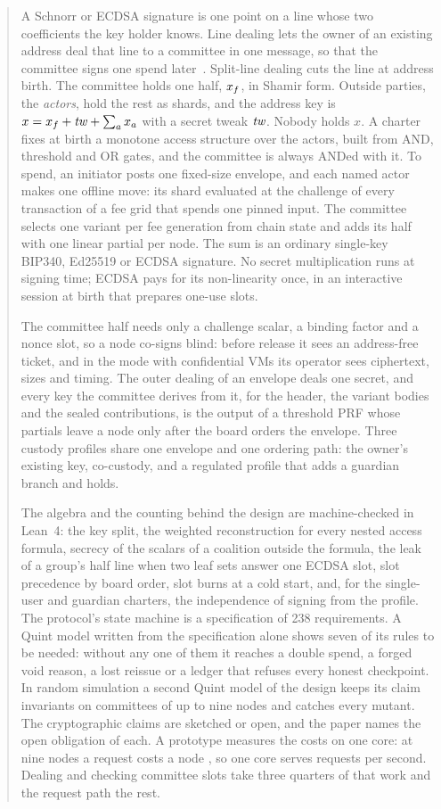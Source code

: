 \begin{abstract}
A Schnorr or ECDSA signature is one point on a line whose two coefficients the key holder knows. Line dealing lets the owner of an existing address deal that line to a committee in one message, so that the committee signs one spend later~\cite{LD}. Split-line dealing cuts the line at address birth. The committee holds one half, $\xf$, in Shamir form. Outside parties, the \emph{actors}, hold the rest as shards, and the address key is $x = \xf + \tw + \sum_a x_a$ with a secret tweak $\tw$. Nobody holds $x$. A charter fixes at birth a monotone access structure over the actors, built from AND, threshold and OR gates, and the committee is always ANDed with it. To spend, an initiator posts one fixed-size envelope, and each named actor makes one offline move: its shard evaluated at the challenge of every transaction of a fee grid that spends one pinned input. The committee selects one variant per fee generation from chain state and adds its half with one linear partial per node. The sum is an ordinary single-key BIP340, Ed25519 or ECDSA signature. No secret multiplication runs at signing time; ECDSA pays for its non-linearity once, in an interactive session at birth that prepares one-use slots.

The committee half needs only a challenge scalar, a binding factor and a nonce slot, so a node co-signs blind: before release it sees an address-free ticket, and in the mode with confidential VMs its operator sees ciphertext, sizes and timing. The outer dealing of an envelope deals one secret, and every key the committee derives from it, for the header, the variant bodies and the sealed contributions, is the output of a threshold PRF whose partials leave a node only after the board orders the envelope. Three custody profiles share one envelope and one ordering path: the owner's existing key, co-custody, and a regulated profile that adds a guardian branch and holds.

The algebra and the counting behind the design are machine-checked in Lean~4: the key split, the weighted reconstruction for every nested access formula, secrecy of the scalars of a coalition outside the formula, the leak of a group's half line when two leaf sets answer one ECDSA slot, slot precedence by board order, slot burns at a cold start, and, for the single-user and guardian charters, the independence of signing from the profile. The protocol's state machine is a specification of 238 requirements. A Quint model written from the specification alone shows seven of its rules to be needed: without any one of them it reaches a double spend, a forged void reason, a lost reissue or a ledger that refuses every honest checkpoint. In random simulation a second Quint model of the design keeps its claim invariants on committees of up to nine nodes and catches every mutant. The cryptographic claims are sketched or open, and the paper names the open obligation of each. A prototype measures the costs on one core: at nine nodes a request costs a node \estCpuTotalNine{}, so one core serves \estRateNine{} requests per second. Dealing and checking committee slots take three quarters of that work and the request path the rest.
\end{abstract}
